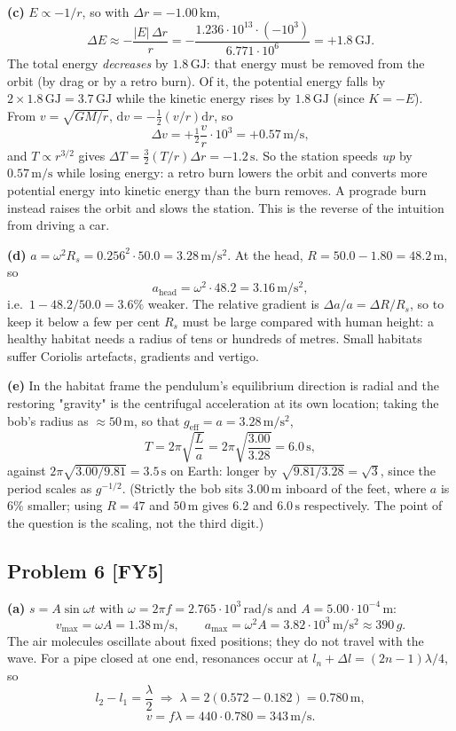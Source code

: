 \documentclass[11pt,a4paper]{article}
\newcommand{\problem}[2]{\subsection*{Problem #1 \; \textnormal{\small[#2]}}}
\newcommand{\unit}[1]{\,\mathrm{#1}}
\begin{document}
\textbf{(c)} $E\propto-1/r$, so with $\Delta r=-1.00\unit{km}$,
\[
  \Delta E \approx -\frac{|E|\,\Delta r}{r}
  =-\frac{1.236\cdot10^{13}\cdot(-10^{3})}{6.771\cdot10^{6}}
  = \boxed{+1.8\unit{GJ}} .
\]
The total energy \emph{decreases} by $1.8\unit{GJ}$: that energy must be
removed from the orbit (by drag or by a retro burn). Of it, the potential
energy falls by $2\times1.8\unit{GJ}=3.7\unit{GJ}$ while the kinetic energy
rises by $1.8\unit{GJ}$ (since $K=-E$). From $v=\sqrt{GM/r}$,
$\mathrm dv=-\tfrac12(v/r)\mathrm dr$, so
\[
  \Delta v = +\tfrac12\frac{v}{r}\cdot10^{3}=\boxed{+0.57\unit{m/s}},
\]
and $T\propto r^{3/2}$ gives $\Delta T=\tfrac32(T/r)\Delta r=-1.2\unit{s}$.
So the station speeds \emph{up} by $0.57\unit{m/s}$ while losing energy: a
retro burn lowers the orbit and converts more potential energy into kinetic
energy than the burn removes. A prograde burn instead raises the orbit and
slows the station. This is the reverse of the intuition from driving a car.

\textbf{(d)} $a=\omega^2R_s=0.256^2\cdot50.0=3.28\unit{m/s^2}$. At the
head, $R=50.0-1.80=48.2\unit{m}$, so
\[
  a_{\text{head}}=\omega^2\cdot48.2=3.16\unit{m/s^2},
\]
i.e.\ $1-48.2/50.0=3.6\%$ weaker. The relative gradient is
$\Delta a/a=\Delta R/R_s$, so to keep it below a few per cent $R_s$ must be
large compared with human height: a healthy habitat needs a radius of
tens or hundreds of metres. Small habitats suffer Coriolis artefacts,
gradients and vertigo.

\textbf{(e)} In the habitat frame the pendulum's equilibrium direction is
radial and the restoring "gravity" is the centrifugal acceleration at its
own location; taking the bob's radius as $\approx50\unit{m}$, so that
$g_{\text{eff}}=a=3.28\unit{m/s^2}$,
\[
  T=2\pi\sqrt{\frac{L}{a}}=2\pi\sqrt{\frac{3.00}{3.28}}
  =\boxed{6.0\unit{s}},
\]
against $2\pi\sqrt{3.00/9.81}=3.5\unit{s}$ on Earth: longer by
$\sqrt{9.81/3.28}=\sqrt3$, since the period scales as $g^{-1/2}$. (Strictly
the bob sits $3.00\unit{m}$ inboard of the feet, where $a$ is $6\%$ smaller;
using $R=47$ and $50\unit{m}$ gives $6.2$ and $6.0\unit{s}$ respectively.
The point of the question is the scaling, not the third digit.)

\problem{6}{FY5}
\textbf{(a)} $s=A\sin\omega t$ with
$\omega=2\pi f=2.765\cdot10^{3}\unit{rad/s}$ and $A=5.00\cdot10^{-4}\unit{m}$:
\[
  v_{\max}=\omega A=\boxed{1.38\unit{m/s}},\qquad
  a_{\max}=\omega^2A=\boxed{3.82\cdot10^{3}\unit{m/s^2}}\approx390\,g.
\]
The air molecules oscillate about fixed positions; they do not travel with
the wave. For a pipe closed at one end, resonances occur at
$l_n+\Delta l=(2n-1)\lambda/4$, so
\[
  l_2-l_1=\frac{\lambda}{2}
  \;\Longrightarrow\;
  \lambda=2(0.572-0.182)=0.780\unit{m},
\]
\[
  v=f\lambda=440\cdot0.780=\boxed{343\unit{m/s}} .
\]
\end{document}

